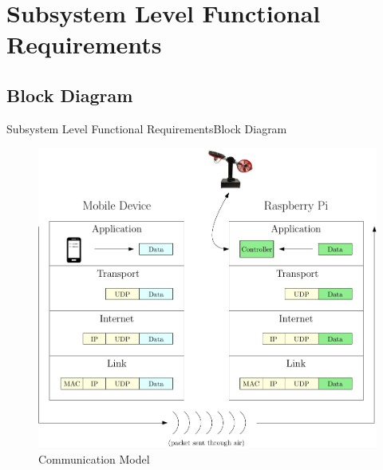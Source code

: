 \documentclass{beamer}
\begin{document}
  


\section{Subsystem Level Functional Requirements}



\subsection{Block Diagram}

\begin{frame}{Subsystem Level Functional Requirements}{Block Diagram}

\begin{figure}
  \centering
  \includegraphics[scale=0.31]{figs/ipe/TCPModel}
  \caption{Communication Model}
  \label{fig:TCPModel}
\end{figure}

\end{frame}
\end{document}
